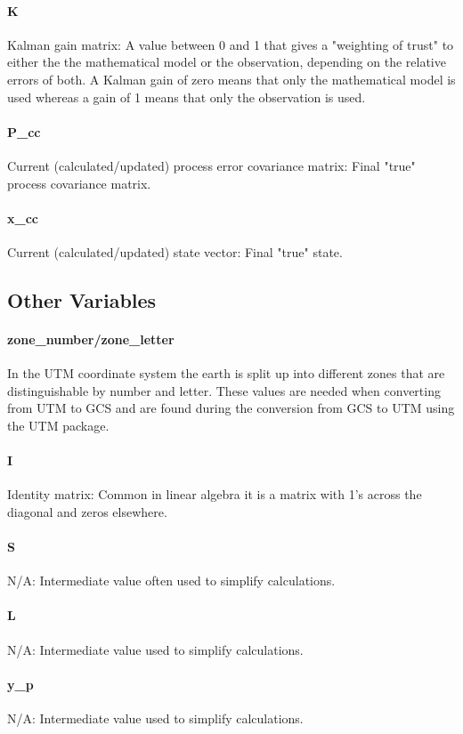 \documentclass{article}
\begin{document}
\paragraph{K}
Kalman gain matrix: A value between 0 and 1 that gives a "weighting of trust" to either the the mathematical model or the observation, depending on the relative errors of both. A Kalman gain of zero means that only the mathematical model is used whereas a gain of 1 means that only the observation is used.
\paragraph{P\_cc}
Current (calculated/updated) process error covariance matrix: Final "true" process covariance matrix.
\paragraph{x\_cc}
Current (calculated/updated) state vector: Final "true" state.

\subsection{Other Variables}
\paragraph{zone\_number/zone\_letter}
In the UTM coordinate system the earth is split up into different zones that are distinguishable by number and letter. These values are needed when converting from UTM to GCS and are found during the conversion from GCS to UTM using the UTM package. 
\paragraph{I}
Identity matrix: Common in linear algebra it is a matrix with 1's across the diagonal and zeros elsewhere.
\paragraph{S}
N/A: Intermediate value often used to simplify calculations.
\paragraph{L}
N/A: Intermediate value used to simplify calculations.
\paragraph{y\_p}
N/A: Intermediate value used to simplify calculations.
\end{document}
